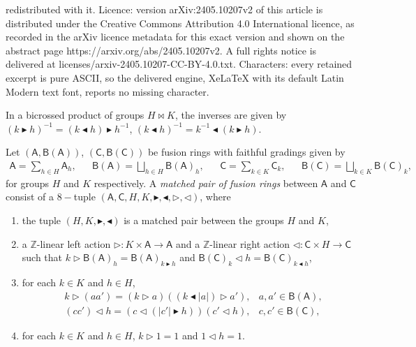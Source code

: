 \documentclass[10pt,a4paper]{amsart}
\newcommand{\degf}[1]{\left|#1\right|}
\newcommand{\fiz}{\triangleleft}
\newcommand{\fizb}{\blacktriangleleft}
\newcommand{\trid}{\triangleright}
\newcommand{\tridb}{\blacktriangleright}
\begin{document}
redistributed with it. Licence: version arXiv:2405.10207v2 of this article is distributed under the Creative Commons Attribution 4.0 International licence, as recorded in the arXiv licence metadata for this exact version and shown on the abstract page https://arxiv.org/abs/2405.10207v2. A full rights notice is delivered at licenses/arxiv-2405.10207-CC-BY-4.0.txt. Characters: every retained excerpt is pure ASCII, so the delivered engine, XeLaTeX with its default Latin Modern text font, reports no missing character.
\begin{remark}\label{remark:inversas-matched-pair-grupos}
In a bicrossed product of groups $H\bowtie K$, the inverses are given by $(k\tridb h)^{-1} = (k\fizb h)\tridb h^{-1}$, $(k\fizb h)^{-1} = k^{-1}\fizb (k\tridb h)$. 
\end{remark}

\begin{definition}\label{def:mathced-pair-fusion-rings}
    Let $(\mathsf{A},\mathsf{B}(\mathsf{A}))$, $(\mathsf{C},\mathsf{B}(\mathsf{C}))$ be fusion rings with faithful gradings given by
    \begin{align*}
        \mathsf{A} = \sum_{h\in H} \mathsf{A}_h, && \mathsf{B}(\mathsf{A}) = \bigsqcup_{h\in H} \mathsf{B}(\mathsf{A})_h, &&   \mathsf{C} = \sum_{k\in K} \mathsf{C}_k, && \mathsf{B}(\mathsf{C}) = \bigsqcup_{k\in K} \mathsf{B}(\mathsf{C})_k, 
    \end{align*}
    for groups $H$ and $K$ respectively. A \emph{matched pair of fusion rings} between $\mathsf{A}$ and $\mathsf{C}$ consist of a $8-$tuple $(\mathsf A, \mathsf C, H, K, \tridb, \fizb, \trid, \fiz)$, where
    \begin{enumerate}[leftmargin=*,label=\rm{(\roman*)}]
    \item the tuple $(H, K, \tridb, \fizb)$ is a matched pair between the groups $H$ and $K$,
    \item\label{def:mathced-pair-fusion-rings-2} a $\mathbb{Z}$-linear left action $\trid\colon K\times \mathsf{A} \to \mathsf{A}$ and a $\mathbb{Z}$-linear right action $\fiz\colon \mathsf{C}\times H \to \mathsf{C}$ such that $k \trid \mathsf{B}(\mathsf{
A})_h = \mathsf{B}(\mathsf{A})_{k\tridb h}$ and $\mathsf{B}(\mathsf{C})_k \fiz h= \mathsf{B}(\mathsf{C})_{k \fizb h}$,
    \item\label{def:mathced-pair-fusion-rings-3} for each $k\in K$ and $h\in H$,
    \begin{align*}
        & k\trid (aa') = (k\trid a) ((k\fizb\degf{a})\trid a'), & a,a'\in \mathsf{B} (\mathsf{A}),\\
        &(cc')\fiz h = (c\fiz (\degf{c'}\tridb h)) (c'\fiz h), & c,c'\in\mathsf{B} (\mathsf{C}),
    \end{align*}
 \item\label{def:mathced-pair-fusion-rings-4} for each $k\in K$ and $h\in H$, $k\trid 1=1$ and $1\fiz h=1.$
    \end{enumerate}
    \end{definition}
\end{document}
